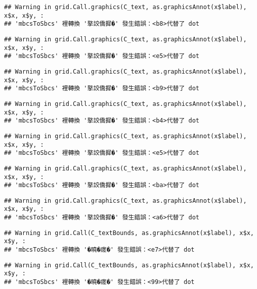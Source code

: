 \documentclass[
]{article}
\begin{document}
\begin{verbatim}
## Warning in grid.Call.graphics(C_text, as.graphicsAnnot(x$label), x$x, x$y, :
## 'mbcsToSbcs' 裡轉換 '摮詨僑摨�' 發生錯誤：<b8>代替了 dot
\end{verbatim}

\begin{verbatim}
## Warning in grid.Call.graphics(C_text, as.graphicsAnnot(x$label), x$x, x$y, :
## 'mbcsToSbcs' 裡轉換 '摮詨僑摨�' 發生錯誤：<e5>代替了 dot
\end{verbatim}

\begin{verbatim}
## Warning in grid.Call.graphics(C_text, as.graphicsAnnot(x$label), x$x, x$y, :
## 'mbcsToSbcs' 裡轉換 '摮詨僑摨�' 發生錯誤：<b9>代替了 dot
\end{verbatim}

\begin{verbatim}
## Warning in grid.Call.graphics(C_text, as.graphicsAnnot(x$label), x$x, x$y, :
## 'mbcsToSbcs' 裡轉換 '摮詨僑摨�' 發生錯誤：<b4>代替了 dot
\end{verbatim}

\begin{verbatim}
## Warning in grid.Call.graphics(C_text, as.graphicsAnnot(x$label), x$x, x$y, :
## 'mbcsToSbcs' 裡轉換 '摮詨僑摨�' 發生錯誤：<e5>代替了 dot
\end{verbatim}

\begin{verbatim}
## Warning in grid.Call.graphics(C_text, as.graphicsAnnot(x$label), x$x, x$y, :
## 'mbcsToSbcs' 裡轉換 '摮詨僑摨�' 發生錯誤：<ba>代替了 dot
\end{verbatim}

\begin{verbatim}
## Warning in grid.Call.graphics(C_text, as.graphicsAnnot(x$label), x$x, x$y, :
## 'mbcsToSbcs' 裡轉換 '摮詨僑摨�' 發生錯誤：<a6>代替了 dot
\end{verbatim}

\begin{verbatim}
## Warning in grid.Call(C_textBounds, as.graphicsAnnot(x$label), x$x, x$y, :
## 'mbcsToSbcs' 裡轉換 '�曉�瘥�' 發生錯誤：<e7>代替了 dot
\end{verbatim}

\begin{verbatim}
## Warning in grid.Call(C_textBounds, as.graphicsAnnot(x$label), x$x, x$y, :
## 'mbcsToSbcs' 裡轉換 '�曉�瘥�' 發生錯誤：<99>代替了 dot
\end{verbatim}
\end{document}
